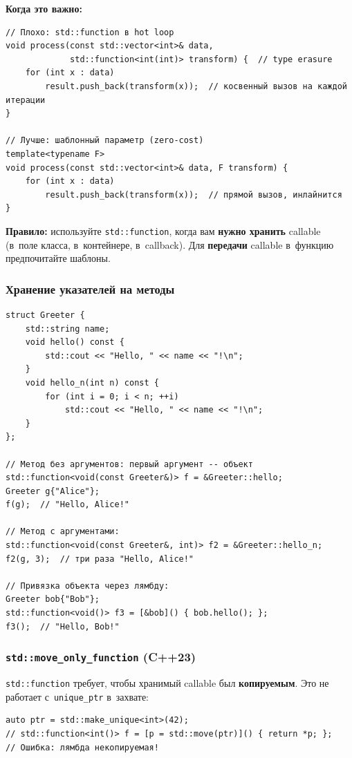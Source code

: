 \documentclass[a4paper,12pt]{article}
\begin{document}
\textbf{Когда это важно:}

\begin{lstlisting}
// Плохо: std::function в hot loop
void process(const std::vector<int>& data,
             std::function<int(int)> transform) {  // type erasure
    for (int x : data)
        result.push_back(transform(x));  // косвенный вызов на каждой итерации
}

// Лучше: шаблонный параметр (zero-cost)
template<typename F>
void process(const std::vector<int>& data, F transform) {
    for (int x : data)
        result.push_back(transform(x));  // прямой вызов, инлайнится
}
\end{lstlisting}

\textbf{Правило:} используйте \texttt{std::function}, когда вам \textbf{нужно хранить}
callable (в~поле класса, в~контейнере, в~callback). Для \textbf{передачи}
callable в~функцию предпочитайте шаблоны.

\subsubsection{Хранение указателей на методы}

\begin{lstlisting}
struct Greeter {
    std::string name;
    void hello() const {
        std::cout << "Hello, " << name << "!\n";
    }
    void hello_n(int n) const {
        for (int i = 0; i < n; ++i)
            std::cout << "Hello, " << name << "!\n";
    }
};

// Метод без аргументов: первый аргумент -- объект
std::function<void(const Greeter&)> f = &Greeter::hello;
Greeter g{"Alice"};
f(g);  // "Hello, Alice!"

// Метод с аргументами:
std::function<void(const Greeter&, int)> f2 = &Greeter::hello_n;
f2(g, 3);  // три раза "Hello, Alice!"

// Привязка объекта через лямбду:
Greeter bob{"Bob"};
std::function<void()> f3 = [&bob]() { bob.hello(); };
f3();  // "Hello, Bob!"
\end{lstlisting}

\subsubsection{\texttt{std::move\_only\_function} (C++23)}

\texttt{std::function} требует, чтобы хранимый callable был \textbf{копируемым}.
Это не работает с~\texttt{unique\_ptr} в~захвате:

\begin{lstlisting}
auto ptr = std::make_unique<int>(42);
// std::function<int()> f = [p = std::move(ptr)]() { return *p; };
// Ошибка: лямбда некопируемая!
\end{lstlisting}
\end{document}
